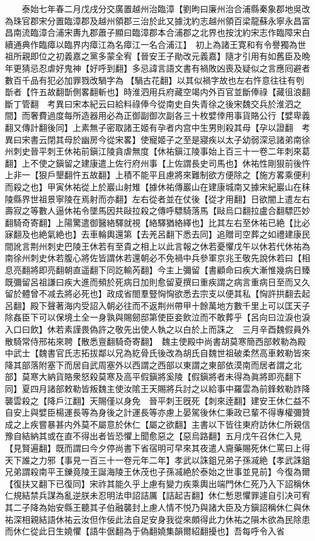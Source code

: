 　　泰始七年春二月戊戌分交廣置越州治臨漳【劉昫曰廉州治合浦縣秦象郡地吳改為珠官郡宋分置臨漳郡及越州領郡三治於此又據沈約志越州領百梁龍蘇永寧永昌富昌南流臨漳合浦宋夀九郡蕭子顯曰臨漳郡本合浦郡之北界也按沈約宋志作臨障宋白續通典作臨瘴以臨界内瘴江為名瘴江一名合浦江】　初上為諸王寛和有令譽獨為世祖所親即位之初義嘉之黨多蒙全宥【晉安王子勛改元義嘉】隨才引用有如舊臣及晩年更猜忌忍虐好鬼神【好呼到翻】多忌諱言語文書有禍敗凶喪及疑似之言應囘避者數百千品有犯必加罪戮改騧字為【騧古花翻】以其似禍字故也左右忤意往往有刳斮者【忤五故翻斮側畧翻斬也】時淮泗用兵府藏空竭内外百官並斷俸祿【藏徂浪翻斷丁管翻　考異曰宋本紀云曰給料祿俸今從南史自失青徐之後宋魏交兵於淮泗之間】而奢費過度每所造器用必為正御副御次副各三十枚嬖倖用事貨賂公行【嬖卑義翻又傳計翻後同】上素無子密取諸王姬有孕者内宫中生男則殺其母【孕以證翻　考異曰宋書云閉其母於幽房今從宋畧】使寵姬子之至是寢疾以太子幼弱深忌諸弟南徐州刺史晉平刺王休祐前鎭江陵貪虐無度【休祐鎭江陵事始上百三十一卷二年刺來葛翻】上不使之鎭留之建康遣上佐行府州事【上佐謂長史司馬也】休祐性剛狠前後忤上非一【狠戶墾翻忤五故翻】上積不能平且慮將來難制欲方便除之【施方畧乘便利而殺之也】甲寅休祐從上於巖山射雉【據休祐傳巖山在建康城南又據宋紀巖山在秣陵縣界世祖景寧陵在焉射而亦翻】左右從者並在仗後【從才用翻】日欲闇上遣左右壽寂之等數人逼休祐令墜馬因共敺拉殺之傳呼驃騎落馬【敺烏口翻拉盧合翻驃匹妙翻騎奇寄翻】上陽驚遣御醫絡驛就視【絡驛猶絡繹也】比其左右至休祐已絶【比必寐翻及也絶氣絶也】去車輪輿還第【去羌呂翻下悉去同】追贈司空葬之如禮建康民間訛言荆州刺史巴陵王休若有至貴之相上以此言報之休若憂懼戊午以休若代休祐為南徐州刺史休若腹心將佐皆謂休若還朝必不免禍中兵參軍京兆王敬先說休若曰【相息亮翻將即亮翻朝直遥翻下同訖輸芮翻】今主上彌留【書顧命曰疾大漸惟幾病日臻既彌留呂祖謙曰疾大進而頻於死病日加則愈留夏撰曰重疾謂之病言重病日至而又久留於體曾不减去將必死也】政成省閤羣豎恟恟欲悉去宗支以便其私【恟許拱翻去起呂翻】殿下聲著海内受詔入朝必往而不返荆州帶甲十餘萬地方數千里上可以匡天子除姦臣下可以保境土全一身孰與賜劒邸第使臣妾飲泣而不敢葬乎【呂向曰泣淚也淚入口曰飲】休若素謹畏偽許之敬先出使人執之以白於上而誅之　三月辛酉魏假員外散騎常侍邢祐來聘【散悉亶翻騎奇寄翻】　魏主使殿中尚書胡莫寒簡西部敕勒為殿中武士【魏書官氏志拓拔鄰以兄為紇骨氏後改為胡氏自魏世祖破柔然高車敕勒皆來降其部落附塞下而居自武周塞外以西謂之西部以東謂之東部依漠南而居者謂之北部】莫寒大納貨賂衆怒殺莫寒及高平假鎭將奚陵【假鎭將者未得為眞將即亮翻下同】夏四月諸部敕勒皆叛魏主使汝隂王天賜將兵討之以給事中羅雲為前鋒敕勒詐降襲雲殺之【降戶江翻】天賜僅以身免　晉平刺王旣死【刺來逹翻】建安王休仁益不自安上與嬖臣楊運長等為身後之計運長等亦慮上晏駕後休仁秉政已輩不得專權彌贊成之上疾嘗暴甚内外莫不屬意於休仁【屬之欲翻】主書以下皆往東府訪休仁所親信豫自結納其或在直不得出者皆恐懼上聞愈惡之【惡烏路翻】五月戊午召休仁入見【見賢遍翻】既而謂曰今夕停尚書下省宿明可早來其夜遣人齎藥賜死休仁罵曰上得天下誰之力邪【事見一百三十一卷元年二年】孝武以誅鉏兄弟子孫㓕絶【孝武誅鉏兄弟謂殺南平王鑠竟陵王誕海陵王休茂也子孫㓕絶於泰始之世事並見前】今復為爾【復扶又翻下已復同】宋祚其能久乎上慮有變力疾乘輿出端門休仁死乃入下詔稱休仁規結禁兵謀為亂逆朕未忍明法申詔詰厲【詰起吉翻】休仁慙恩懼罪遽自引决可宥其二子降為始安縣王聽其子伯融襲封上慮人情不悦乃與諸大臣及方鎭詔稱休仁與休祐深相親結語休祐云汝但作佞此法自足安身我從來頗得此力休祐之隕木欲為民除患而休仁從此日生嬈懼【語牛倨翻為于偽翻嬈集韻爾紹翻擾也】吾每呼令入省